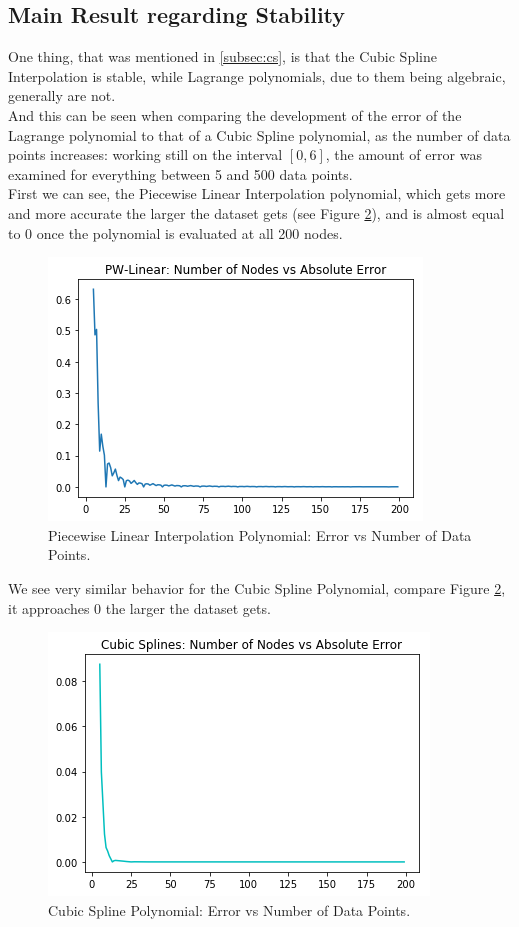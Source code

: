 \documentclass[a4paper,11pt, notitlepage]{article}
\begin{document}
\begin{onehalfspace}
\subsection{Main Result regarding Stability}
\label{subsec:stab}
One thing, that was mentioned in \ref{subsec:cs}, is that the Cubic Spline Interpolation is stable, while Lagrange polynomials, due to them being algebraic, generally are not. \\
And this can be seen when comparing the development of the error of the Lagrange polynomial to that of a Cubic Spline polynomial, as the number of data points increases: working still on the interval $[0,6]$, the amount of error was examined for everything between 5 and 500 data points. \\
First we can see, the Piecewise Linear Interpolation polynomial, which gets more and more accurate the larger the dataset gets (see Figure \ref{fig:cs-bign}), and is almost equal to 0 once the polynomial is evaluated at all 200 nodes.

\begin{figure}[H]
	\centering
	\includegraphics[]{./images/pw-lin-bign.png}
	\caption{Piecewise Linear Interpolation Polynomial: Error vs Number of Data Points.}
	\label{fig:pw-lin-bign}
\end{figure}

We see very similar behavior for the Cubic Spline Polynomial, compare Figure \ref{fig:cs-bign}, it approaches 0 the larger the dataset gets.

\begin{figure}[H]
	\centering
	\includegraphics[]{./images/cs-bign.png}
	\caption{Cubic Spline Polynomial: Error vs Number of Data Points.}
	\label{fig:cs-bign}
\end{figure}


\end{onehalfspace}
\end{document}
